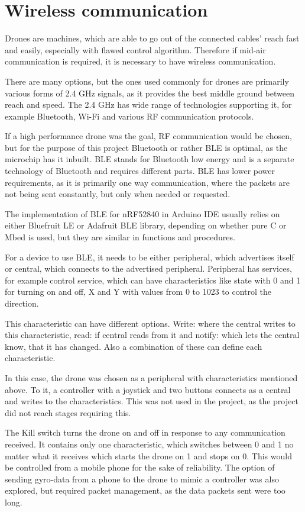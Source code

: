 \section{Wireless communication}
Drones are machines, which are able to go out of the connected cables' reach fast and easily, especially with flawed control algorithm. Therefore if mid-air communication is required, it is necessary to have wireless communication.

There are many options, but the ones used commonly for drones are primarily various forms of 2.4 GHz signals, as it provides the best middle ground between reach and speed. The 2.4 GHz has wide range of technologies supporting it, for example Bluetooth, Wi-Fi and various RF communication protocols. 

If a high performance drone was the goal, RF communication would be chosen, but for the purpose of this project Bluetooth or rather BLE is optimal, as the microchip has it inbuilt. BLE stands for Bluetooth low energy and is a separate technology of Bluetooth and requires different parts. BLE has lower power requirements, as it is primarily one way communication, where the packets are not being sent constantly, but only when needed or requested.

The implementation of BLE for nRF52840 in Arduino IDE usually relies on either Bluefruit LE or Adafruit BLE library, depending on whether pure C or Mbed is used, but they are similar in functions and procedures.

For a device to use BLE, it needs to be either peripheral, which advertises itself or central, which connects to the advertised peripheral. Peripheral has services, for example control service, which can have characteristics like state with 0 and 1 for turning on and off, X and Y with values from 0 to 1023 to control the direction.

This characteristic can have different options. Write: where the central writes to this characteristic, read: if central reads from it and notify: which lets the central know, that it has changed. Also a combination of these can define each characteristic.

In this case, the drone was chosen as a peripheral with characteristics mentioned above. To it, a controller with a joystick and two buttons connects as a central and writes to the characteristics. This was not used in the project, as the project did not reach stages requiring this.

The Kill switch turns the drone on and off in response to any communication received. It contains only one characteristic, which switches between 0 and 1 no matter what it receives which starts the drone on 1 and stops on 0. This would be controlled from a mobile phone for the sake of reliability. The option of sending gyro-data from a phone to the drone to mimic a controller was also explored, but required packet management, as the data packets sent were too long.

